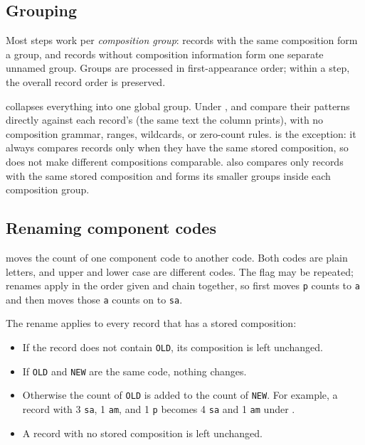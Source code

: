 \subsection{Grouping}\label{sec:grouping}

Most steps work per \emph{composition group}: records with the same
composition form a group, and records without composition information form
one separate unnamed group. Groups are processed in first-appearance order;
within a step, the overall record order is preserved.

 collapses everything into one global group. Under
,  and  compare their patterns
directly against each record's  (the same text the 
column prints), with no composition grammar, ranges, wildcards, or zero-count
rules.  is the exception: it always compares records only
when they have the same stored composition, so  does not make
different compositions comparable.  also compares only
records with the same stored composition and forms its smaller groups inside
each composition group.

\subsection{Renaming component codes}\label{sec:rename}

 moves the count of one component code to another code.
Both codes are plain letters, and upper and lower case are different codes. The
flag may be repeated; renames apply in the order given and chain together, so
 first moves \texttt{p} counts to \texttt{a}
and then moves those \texttt{a} counts on to \texttt{sa}.

The rename applies to every record that has a stored composition:

\begin{itemize}
  \item If the record does not contain \texttt{OLD}, its composition is left
        unchanged.
  \item If \texttt{OLD} and \texttt{NEW} are the same code, nothing changes.
  \item Otherwise the count of \texttt{OLD} is added to the count of
        \texttt{NEW}. For example, a record with 3 \texttt{sa}, 1 \texttt{am},
        and 1 \texttt{p} becomes 4 \texttt{sa} and 1 \texttt{am} under
        .
  \item A record with no stored composition is left unchanged.
\end{itemize}

